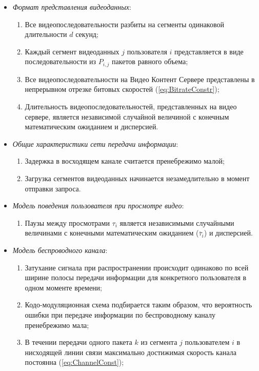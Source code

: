 \begin{itemize}
	\item \textit{Формат представления видеоданных}:
		\begin{enumerate}
			\item Все видеопоследовательности разбиты на сегменты одинаковой длительности $d$ секунд;
			\item Каждый сегмент видеоданных $j$ пользователя $i$ представляется в виде последовательности из $P_{i,j}$ пакетов равного объема;
			\item Все видеопоследовательности на Видео Контент Сервере представлены в непрерывном отрезке битовых скоростей (\ref{eq:BitrateConstr});
			\item Длительность видеопоследовательностей, представленных на видео сервере, является независимой случайной величиной с конечным математическим ожиданием и дисперсией.
		\end{enumerate}
	\item \textit{Общие характеристики сети передачи информации}:
		\begin{enumerate}
			\item Задержка в восходящем канале считается пренебрежимо малой;
			\item Загрузка сегментов видеоданных начинается незамедлительно в момент отправки запроса.
		\end{enumerate}
	\item \textit{Модель поведения пользователя при просмотре видео}:
		\begin{enumerate}
			\item Паузы между просмотрами $\tau_i$ является независимыми случайными величинами с конечными математическим ожиданием ($\overline{\tau}_i$) и дисперсией.
		\end{enumerate}
	\item \textit{Модель беспроводного канала}:
		\begin{enumerate}
			\item Затухание сигнала при распространении происходит одинаково по всей ширине полосы передачи информации для конкретного пользователя в одном моменте времени;
			\item Кодо-модуляционная схема подбирается таким образом, что вероятность ошибки при передаче информации по беспроводному каналу пренебрежимо мала;
			\item В течении передачи одного пакета $k$ из сегмента $j$ пользователем $i$ в нисходящей линии связи максимально достижимая скорость канала постоянна (\ref{eq:ChannelConst});

\end{enumerate}
\end{itemize}
